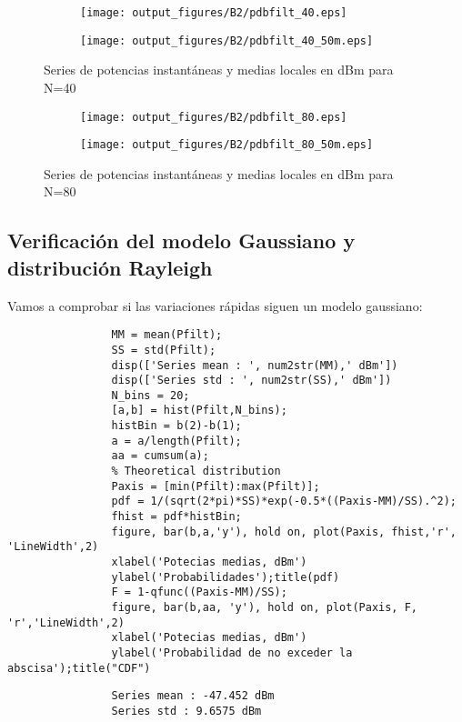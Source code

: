 \documentclass{article}
\begin{document}
             \begin{figure}[h]
                \centering
                \begin{subfigure}
                    \centering          \texttt{[image: output\_figures/B2/pdbfilt\_40.eps]}
               \end{subfigure}
               \begin{subfigure}
                    \centering          \texttt{[image: output\_figures/B2/pdbfilt\_40\_50m.eps]}
               \end{subfigure}    
               \caption{Series de potencias instantáneas y medias locales en dBm para N=40}
                \label{fig:sup_rugosas}
            \end{figure}
             \begin{figure}[h]
                \centering
                \begin{subfigure}
                    \centering          \texttt{[image: output\_figures/B2/pdbfilt\_80.eps]}
               \end{subfigure}
               \begin{subfigure}
                    \centering          \texttt{[image: output\_figures/B2/pdbfilt\_80\_50m.eps]}
               \end{subfigure}    
               \caption{Series de potencias instantáneas y medias locales en dBm para N=80}
                \label{fig:sup_rugosas}
            \end{figure}
            \clearpage
        \subsection{Verificación del modelo Gaussiano y distribución Rayleigh}
            \par Vamos a comprobar si las variaciones rápidas siguen un modelo gaussiano:
            \begin{lstlisting}
                MM = mean(Pfilt);
                SS = std(Pfilt);
                disp(['Series mean : ', num2str(MM),' dBm'])
                disp(['Series std : ', num2str(SS),' dBm'])
                N_bins = 20;
                [a,b] = hist(Pfilt,N_bins);
                histBin = b(2)-b(1);
                a = a/length(Pfilt);
                aa = cumsum(a);
                % Theoretical distribution
                Paxis = [min(Pfilt):max(Pfilt)];
                pdf = 1/(sqrt(2*pi)*SS)*exp(-0.5*((Paxis-MM)/SS).^2);
                fhist = pdf*histBin;
                figure, bar(b,a,'y'), hold on, plot(Paxis, fhist,'r', 'LineWidth',2)
                xlabel('Potecias medias, dBm')
                ylabel('Probabilidades');title(pdf)
                F = 1-qfunc((Paxis-MM)/SS);
                figure, bar(b,aa, 'y'), hold on, plot(Paxis, F, 'r','LineWidth',2)
                xlabel('Potecias medias, dBm')
                ylabel('Probabilidad de no exceder la abscisa');title("CDF")
            \end{lstlisting}
            \begin{verbatim}
                Series mean : -47.452 dBm
                Series std : 9.6575 dBm
            \end{verbatim}
           
\end{document}
